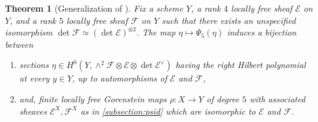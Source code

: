 \documentclass[12 pt]{amsart}
\theoremstyle{plain}
\newtheorem{theorem}[subsection]{Theorem}
\theoremstyle{definition}
\theoremstyle{remark}
\numberwithin{equation}{section}
\newcommand\bp{\mathbb P}
\newcommand\sce{\mathscr E}
\newcommand\scf{\mathscr F}
\newcommand \ra{\rightarrow}
\begin{document}
\begin{theorem}[Generalization of ]
	\label{theorem:5-structure} Fix a scheme $Y$, a rank $4$ locally free
	sheaf $\sce$ on $Y$, and a rank $5$ locally free sheaf $\scf$ on $Y$
	such that there exists an unspecified 
	isomorphism $\det \scf \simeq (\det \sce)^{\otimes 2}$.
	The map $\eta \mapsto \Psi_5(\eta)$ induces a bijection between 
	\begin{enumerate}
\item 		sections $\eta \in H^0(Y, \wedge^2 \scf \otimes \sce \otimes
	\det \sce^{\vee})$ having the right Hilbert polynomial at every $y \in Y$,
up to automorphisms of $\sce$
	and $\scf$,
\item and, finite locally free Gorenstein maps $\rho:X
	\ra Y$ of degree $5$ with associated sheaves $\sce^X, \scf^X$ 
	as in \autoref{subsection:psid}	
	which
	are isomorphic to $\sce$ and $\scf$.
	\end{enumerate}
\end{theorem} 
\end{document}
